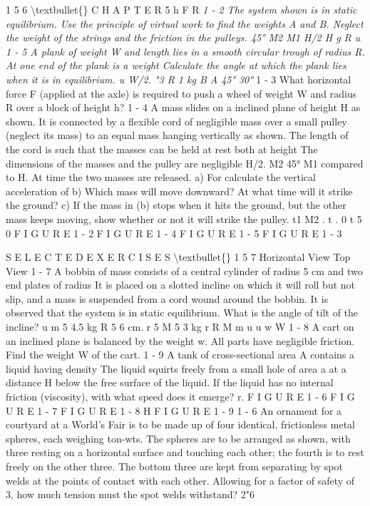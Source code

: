\documentclass[10pt,oneside]{article}
\begin{document}
1 5 6 \textbackslash{}textbullet\{\} C H A P T E R  5 h F R \emph{ 1 - 2 The system shown is in static equilibrium. Use the principle of virtual work to find the weights A and B. Neglect the weight of the strings and the friction in the pulleys. 45° M2 M1 H/2 H g R u } \emph{ 1 - 5 A plank of weight W and length lies in a smooth circular trough of radius R. At one end of the plank is a weight Calculate the angle at which the plank lies when it is in equilibrium. u W/2. "3 R 1 kg B A 45° 30° } 1 - 3 What horizontal force F (applied at the axle) is required to push a wheel of weight W and radius R over a block of height h? \emph{ } 1 - 4 A mass slides on a inclined plane of height H as shown. It is connected by a flexible cord of negligible mass over a small pulley (neglect its mass) to an equal mass hanging vertically as shown. The length of the cord is such that the masses can be held at rest both at height The dimensions of the masses and the pulley are negligible H/2. M2 45° M1 compared to H. At time the two masses are released. a) For calculate the vertical acceleration of b) Which mass will move downward? At what time will it strike the ground? c) If the mass in (b) stops when it hits the ground, but the other mass keeps moving, show whether or not it will strike the pulley. t1 M2 . t . 0 t 5 0 F I G U R E  1 - 2 F I G U R E  1 - 4 F I G U R E  1 - 5 F I G U R E  1 - 3\par

S E L E C T E D  E X E R C I S E S \textbackslash{}textbullet\{\} 1 5 7 Horizontal View Top View \emph{ } 1 - 7 A bobbin of mass consists of a central cylinder of radius 5 cm and two end plates of radius It is placed on a slotted incline on which it will roll but not slip, and a mass is suspended from a cord wound around the bobbin. It is observed that the system is in static equilibrium. What is the angle of tilt of the incline? u m 5 4.5 kg R 5 6 cm. r 5 M 5 3 kg r R M m u u w W \emph{ } 1 - 8 A cart on an inclined plane is balanced by the weight w. All parts have negligible friction. Find the weight W of the cart. \emph{ } 1 - 9 A tank of cross-sectional area A contains a liquid having density The liquid squirts freely from a small hole of area a at a distance H below the free surface of the liquid. If the liquid has no internal friction (viscosity), with what speed does it emerge? r. F I G U R E  1 - 6 F I G U R E  1 - 7 F I G U R E  1 - 8 H F I G U R E  1 - 9 \emph{ } 1 - 6 An ornament for a courtyard at a World’s Fair is to be made up of four identical, frictionless metal spheres, each weighing ton-wts. The spheres are to be arranged as shown, with three resting on a horizontal surface and touching each other; the fourth is to rest freely on the other three. The bottom three are kept from separating by spot welds at the points of contact with each other. Allowing for a factor of safety of 3, how much tension must the spot welds withstand? 2"6\par
\end{document}
